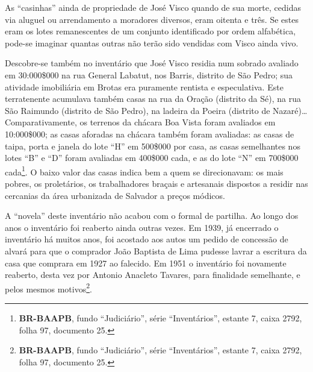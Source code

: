 As ``casinhas'' ainda de propriedade de José Visco quando de sua morte, cedidas via aluguel ou arrendamento a moradores diversos, eram oitenta e três. Se estes eram os lotes remanescentes de um conjunto identificado por ordem alfabética, pode-se imaginar quantas outras não terão sido vendidas com Visco ainda vivo.

Descobre-se também no inventário que José Visco residia num sobrado avaliado em 30:000\$000 na rua General Labatut, nos Barris, distrito de São Pedro; sua atividade imobiliária em Brotas era puramente rentista e especulativa. Este terratenente acumulava também casas na rua da Oração (distrito da Sé), na rua São Raimundo (distrito de São Pedro), na ladeira da Poeira (distrito de Nazaré)\dots Comparativamente, os terrenos da chácara Boa Vista foram avaliados em 10:000\$000; as casas aforadas na chácara também foram avaliadas: as casas de taipa, porta e janela do lote ``H'' em 500\$000 por casa, as casas semelhantes nos lotes ``B'' e ``D'' foram avaliadas em 400\$000 cada, e as do lote ``N'' em 700\$000 cada\footnote{\textbf{BR-BAAPB}, fundo ``Judiciário'', série ``Inventários'', estante 7, caixa 2792, folha 97, documento 25.}. O baixo valor das casas indica bem a quem se direcionavam: os mais pobres, os proletários, os trabalhadores braçais e artesanais dispostos a residir nas cercanias da área urbanizada de Salvador a preços módicos.

A ``novela'' deste inventário não acabou com o formal de partilha. Ao longo dos anos o inventário foi reaberto ainda outras vezes. Em 1939, já encerrado o inventário há muitos anos, foi acostado aos autos um pedido de concessão de alvará para que o comprador João Baptista de Lima pudesse lavrar a escritura da casa que comprara em 1927 ao falecido. Em 1951 o inventário foi novamente reaberto, desta vez por Antonio Anacleto Tavares, para finalidade semelhante, e pelos mesmos motivos\footnote{\textbf{BR-BAAPB}, fundo ``Judiciário'', série ``Inventários'', estante 7, caixa 2792, folha 97, documento 25.}.

